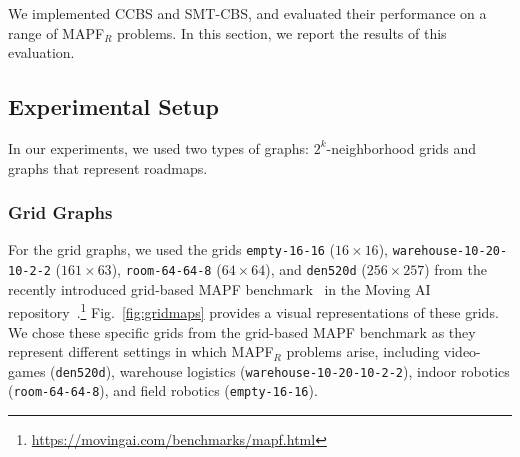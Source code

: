 \documentclass[review]{elsarticle}
\newcommand\roni[1]{\nb{\textbf{Roni:}}{green}{#1}}
\newcommand{\ccbs}{\ac{CCBS}\xspace}
\newcommand{\mapfr}{\ac{MAPF}$_R$\xspace}
\newcommand{\smtcbs}{SMT-CBS\xspace}
\newcommand{\mapf}{\ac{MAPF}\xspace}
\begin{document}
We implemented \ccbs and \smtcbs, and evaluated their performance on a range of \mapfr problems.
In this section, we report the results of this evaluation. 

\subsection{Experimental Setup}
In our experiments, we used two types of graphs: $2^k$-neighborhood grids \cite{rivera2017grid} and graphs that represent roadmaps.


\subsubsection{Grid Graphs} 
For the grid graphs, we used the grids
\texttt{empty-16-16} ($16 \times 16$), \texttt{warehouse-10-20-10-2-2} ($161 \times 63$), \texttt{room-64-64-8} ($64 \times 64$), and \texttt{den520d} ($256 \times 257$) 
from the recently introduced grid-based \mapf benchmark~\cite{stern2019mapf} in the Moving AI repository~\cite{sturtevant2012benchmarks}.\footnote{\url{https://movingai.com/benchmarks/mapf.html}} 
 Fig.~\ref{fig:gridmaps} provides a visual representations of these grids.
We chose these specific grids from the grid-based \mapf benchmark as they represent different settings in which \mapfr problems arise, including video-games (\texttt{den520d}), warehouse logistics (\texttt{warehouse-10-20-10-2-2}), indoor robotics (\texttt{room-64-64-8}), and field robotics (\texttt{empty-16-16}).
\end{document}
